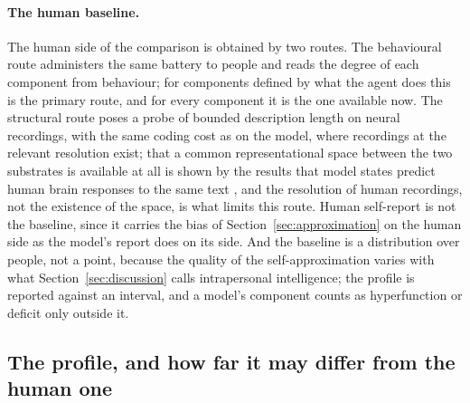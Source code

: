 \paragraph{The human baseline.}
\label{sec:baseline}
The human side of the comparison is obtained by two routes. The behavioural route administers the same
battery to people and reads the degree of each component from behaviour; for components defined by
what the agent does this is the primary route, and for every component it is the one available now.
The structural route poses a probe of bounded description length on neural recordings, with the same
coding cost as on the model, where recordings at the relevant resolution exist; that a common
representational space between the two substrates is available at all is shown by the results that
model states predict human brain responses to the same text
\citep{schrimpf2021,goldstein2022,caucheteux2022}, and the resolution of human recordings, not the
existence of the space, is what limits this route. Human self-report is not the baseline, since it
carries the bias of Section~\ref{sec:approximation} on the human side as the model's report does on
its side. And the baseline is a distribution over people, not a point, because the quality of the
self-approximation varies with what Section~\ref{sec:discussion} calls intrapersonal intelligence; the
profile is reported against an interval, and a model's component counts as hyperfunction or deficit
only outside it.

\subsection{The profile, and how far it may differ from the human one}
\label{sec:profile}
\label{sec:profile-seeing}
\label{sec:predictions}

